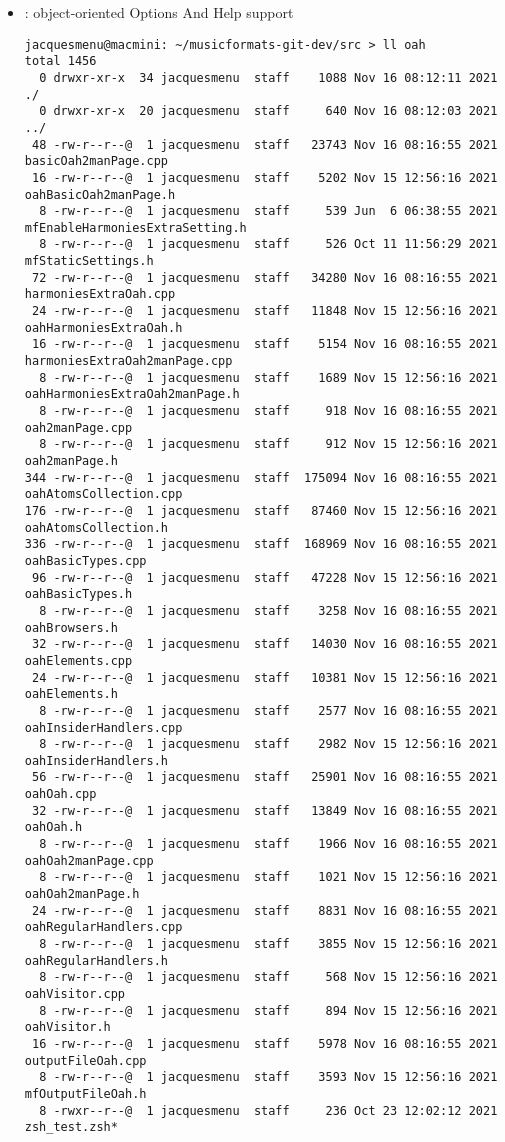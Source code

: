 \begin{itemize}
\item {} : object-oriented Options And Help support
\begin{lstlisting}[language=Terminal]
jacquesmenu@macmini: ~/musicformats-git-dev/src > ll oah
total 1456
  0 drwxr-xr-x  34 jacquesmenu  staff    1088 Nov 16 08:12:11 2021 ./
  0 drwxr-xr-x  20 jacquesmenu  staff     640 Nov 16 08:12:03 2021 ../
 48 -rw-r--r--@  1 jacquesmenu  staff   23743 Nov 16 08:16:55 2021 basicOah2manPage.cpp
 16 -rw-r--r--@  1 jacquesmenu  staff    5202 Nov 15 12:56:16 2021 oahBasicOah2manPage.h
  8 -rw-r--r--@  1 jacquesmenu  staff     539 Jun  6 06:38:55 2021 mfEnableHarmoniesExtraSetting.h
  8 -rw-r--r--@  1 jacquesmenu  staff     526 Oct 11 11:56:29 2021 mfStaticSettings.h
 72 -rw-r--r--@  1 jacquesmenu  staff   34280 Nov 16 08:16:55 2021 harmoniesExtraOah.cpp
 24 -rw-r--r--@  1 jacquesmenu  staff   11848 Nov 15 12:56:16 2021 oahHarmoniesExtraOah.h
 16 -rw-r--r--@  1 jacquesmenu  staff    5154 Nov 16 08:16:55 2021 harmoniesExtraOah2manPage.cpp
  8 -rw-r--r--@  1 jacquesmenu  staff    1689 Nov 15 12:56:16 2021 oahHarmoniesExtraOah2manPage.h
  8 -rw-r--r--@  1 jacquesmenu  staff     918 Nov 16 08:16:55 2021 oah2manPage.cpp
  8 -rw-r--r--@  1 jacquesmenu  staff     912 Nov 15 12:56:16 2021 oah2manPage.h
344 -rw-r--r--@  1 jacquesmenu  staff  175094 Nov 16 08:16:55 2021 oahAtomsCollection.cpp
176 -rw-r--r--@  1 jacquesmenu  staff   87460 Nov 15 12:56:16 2021 oahAtomsCollection.h
336 -rw-r--r--@  1 jacquesmenu  staff  168969 Nov 16 08:16:55 2021 oahBasicTypes.cpp
 96 -rw-r--r--@  1 jacquesmenu  staff   47228 Nov 15 12:56:16 2021 oahBasicTypes.h
  8 -rw-r--r--@  1 jacquesmenu  staff    3258 Nov 16 08:16:55 2021 oahBrowsers.h
 32 -rw-r--r--@  1 jacquesmenu  staff   14030 Nov 16 08:16:55 2021 oahElements.cpp
 24 -rw-r--r--@  1 jacquesmenu  staff   10381 Nov 15 12:56:16 2021 oahElements.h
  8 -rw-r--r--@  1 jacquesmenu  staff    2577 Nov 16 08:16:55 2021 oahInsiderHandlers.cpp
  8 -rw-r--r--@  1 jacquesmenu  staff    2982 Nov 15 12:56:16 2021 oahInsiderHandlers.h
 56 -rw-r--r--@  1 jacquesmenu  staff   25901 Nov 16 08:16:55 2021 oahOah.cpp
 32 -rw-r--r--@  1 jacquesmenu  staff   13849 Nov 16 08:16:55 2021 oahOah.h
  8 -rw-r--r--@  1 jacquesmenu  staff    1966 Nov 16 08:16:55 2021 oahOah2manPage.cpp
  8 -rw-r--r--@  1 jacquesmenu  staff    1021 Nov 15 12:56:16 2021 oahOah2manPage.h
 24 -rw-r--r--@  1 jacquesmenu  staff    8831 Nov 16 08:16:55 2021 oahRegularHandlers.cpp
  8 -rw-r--r--@  1 jacquesmenu  staff    3855 Nov 15 12:56:16 2021 oahRegularHandlers.h
  8 -rw-r--r--@  1 jacquesmenu  staff     568 Nov 15 12:56:16 2021 oahVisitor.cpp
  8 -rw-r--r--@  1 jacquesmenu  staff     894 Nov 15 12:56:16 2021 oahVisitor.h
 16 -rw-r--r--@  1 jacquesmenu  staff    5978 Nov 16 08:16:55 2021 outputFileOah.cpp
  8 -rw-r--r--@  1 jacquesmenu  staff    3593 Nov 15 12:56:16 2021 mfOutputFileOah.h
  8 -rwxr--r--@  1 jacquesmenu  staff     236 Oct 23 12:02:12 2021 zsh_test.zsh*
\end{lstlisting}


\end{itemize}
